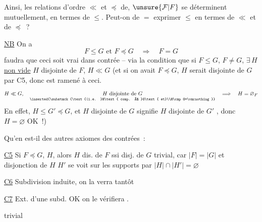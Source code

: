 
Ainsi, les relations d'ordre $\ll$ et $\preceq$ de, $\unsure{\mathcal F|F}$ se déterminent mutuellement, en termes de $\leq$. Peut-on de $=$ exprimer $\leq$ en termes de $\ll$ et de $\preceq$~?

\uline{NB} On a
\[
 F\leq G\text{ et }F\preceq G\quad\Longrightarrow\quad F=G
\]
 faudra que ceci soit vrai dans  contrée -- via la condition que si $F\leq G$, $F\ne G$, $\exists\,H$  \uline{non vide} $H$ disjointe de $F$, $H\ll G$ (et si on avait $F\preceq G$, $H$ serait disjointe de $G$ par C5, donc  est ramené à ceci. 
\[
 H\ll G,\quad
 \underset{\inserted{\substack{\text{(i.e. }H\text{ comp. à }G\text{ et}\\H\cap G=\varnothing}}}{H\text{ disjointe de }G}
 \quad\Longrightarrow\quad H=\varnothing_{F}
\]
En effet, $H\leq G'\preceq G$,  et $H$ disjointe de $G$ signifie $H$ disjointe de $G'$ , donc $H=\varnothing$ OK~!)


Qu'en est-il des autres axiomes des contrées~:

\uline{C5} Si $F\preceq G$, $H$, alors $H$ dis. de $F$ ssi disj. de $G$ trivial, car $|F|=|G|$ et disjonction de $H$  $H'$ se voit sur les supports par $|H|\cap|H'|=\varnothing$

\uline{C6} Subdivision induite, on la verra tantôt

\uline{C7} Ext. d'une subd. OK on le vérifiera .

\uline{} trivial
